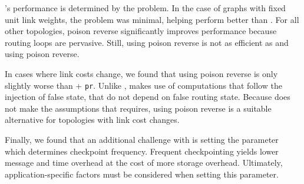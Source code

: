 \seconds's performance is determined by the \infinity problem. In the case of \er graphs with fixed unit link weights, the \infinity problem was minimal, 
helping \second perform better than \purges. %
For all other topologies, poison reverse significantly improves \second performance because routing loops are pervasive.
Still, \second using poison reverse is not as efficient as \cpr and \purge using poison reverse.

In cases where link costs change, we found that \purge using poison reverse is only slightly worse than \cpr + {\tt pr}. %
Unlike \cprs, \purge makes use of computations that follow the injection of false state, that do not depend on false routing state.  
Because \purge does not make the assumptions that \cpr requires, \purge using poison reverse is a suitable alternative for topologies with link cost changes.



Finally, we found that an additional challenge with \cpr is setting the parameter which determines checkpoint frequency.
Frequent checkpointing yields lower message and time overhead at the cost of more storage overhead. Ultimately, application-specific factors must be considered
when setting this parameter. 
